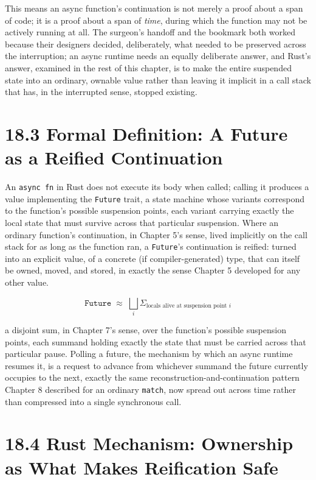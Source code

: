\documentclass[11pt]{book}
\begin{document}
This means an async function's continuation is not merely a proof about a span of code; it is a proof about a span of \emph{time}, during which the function may not be actively running at all. The surgeon's handoff and the bookmark both worked because their designers decided, deliberately, what needed to be preserved across the interruption; an async runtime needs an equally deliberate answer, and Rust's answer, examined in the rest of this chapter, is to make the entire suspended state into an ordinary, ownable value rather than leaving it implicit in a call stack that has, in the interrupted sense, stopped existing.

\section*{18.3 Formal Definition: A Future as a Reified Continuation}

An \texttt{async fn} in Rust does not execute its body when called; calling it produces a value implementing the \texttt{Future} trait, a state machine whose variants correspond to the function's possible suspension points, each variant carrying exactly the local state that must survive across that particular suspension. Where an ordinary function's continuation, in Chapter 5's sense, lived implicitly on the call stack for as long as the function ran, a \texttt{Future}'s continuation is reified: turned into an explicit value, of a concrete (if compiler-generated) type, that can itself be owned, moved, and stored, in exactly the sense Chapter 5 developed for any other value.

\[
\texttt{Future} \;\approx\; \bigsqcup_{i} \Sigma_{\text{locals alive at suspension point } i}
\]

a disjoint sum, in Chapter 7's sense, over the function's possible suspension points, each summand holding exactly the state that must be carried across that particular pause. Polling a future, the mechanism by which an async runtime resumes it, is a request to advance from whichever summand the future currently occupies to the next, exactly the same reconstruction-and-continuation pattern Chapter 8 described for an ordinary \texttt{match}, now spread out across time rather than compressed into a single synchronous call.

\section*{18.4 Rust Mechanism: Ownership as What Makes Reification Safe}
\end{document}

